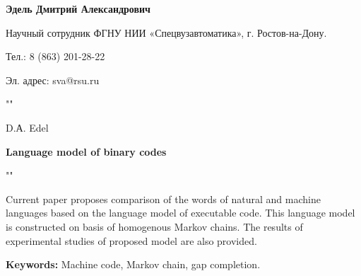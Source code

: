 \documentclass{book}
\begin{document}
\printbibliography[title={\textit{Литература}}, heading=subbibliography]

\begin{large}
	\hangindent=0cm
	\parindent=0cm
\end{large}
	
\begin{normalsize}
	\hangindent=0cm
	\parindent=0cm
	\textbf{Эдель Дмитрий Александрович}

	Научный сотрудник ФГНУ НИИ «Спецвузавтоматика», г. Ростов-на-Дону.
	
	Тел.: 8 (863) 201-28-22
	
	Эл. адрес: sva@rsu.ru

	\par{""}

	D.А. Edel

	\textbf{Language model of binary codes}

	\par{""}

	Current paper proposes comparison of the words of natural and machine languages based on the
	language model of executable code. This language model is constructed on basis of homogenous Markov
	chains. The results of experimental studies of proposed model are also provided.

	\textbf{Keywords:} Machine code, Markov chain, gap completion.

\end{normalsize}
\end{document}
